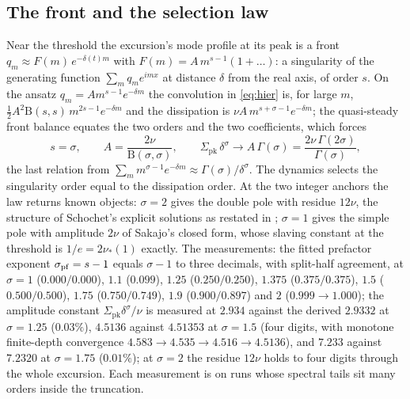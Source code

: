 \documentclass[11pt,a4paper]{article}
\theoremstyle{plain}
\theoremstyle{definition}
\newcommand{\Bfun}{\mathrm{B}}
\newcommand{\pk}{\mathrm{pk}}
\begin{document}
\subsection{The front and the selection law}\label{sec:selection}
Near the threshold the excursion's mode profile at its peak is a front $q_m\approx F(m)\,e^{-\delta(t)m}$ with $F(m)=A\,m^{s-1}(1+\dots)$: a singularity of the generating function $\sum_mq_me^{imx}$ at distance $\delta$ from the real axis, of order $s$. On the ansatz $q_m=Am^{s-1}e^{-\delta m}$ the convolution in \eqref{eq:hier} is, for large $m$, $\tfrac12A^2\Bfun(s,s)\,m^{2s-1}e^{-\delta m}$ and the dissipation is $\nu A\,m^{s+\sigma-1}e^{-\delta m}$; the quasi-steady front balance equates the two orders and the two coefficients, which forces
\begin{equation}\label{eq:selection}
s=\sigma,\qquad A=\frac{2\nu}{\Bfun(\sigma,\sigma)},\qquad \Sigma_{\pk}\,\delta^\sigma\to A\,\Gamma(\sigma)=\frac{2\nu\,\Gamma(2\sigma)}{\Gamma(\sigma)},
\end{equation}
the last relation from $\sum_mm^{\sigma-1}e^{-\delta m}\approx\Gamma(\sigma)/\delta^\sigma$. The dynamics selects the singularity order equal to the dissipation order. At the two integer anchors the law returns known objects: $\sigma=2$ gives the double pole with residue $12\nu$, the structure of Schochet's explicit solutions \cite{Sch86} as restated in \cite[\S5.1]{ALSS24}; $\sigma=1$ gives the simple pole with amplitude $2\nu$ of Sakajo's closed form, whose slaving constant at the threshold is $1/e=2\nu_*(1)$ exactly. The measurements: the fitted prefactor exponent $\sigma_{\rm pf}=s-1$ equals $\sigma-1$ to three decimals, with split-half agreement, at $\sigma=1$ ($0.000/0.000$), $1.1$ ($0.099$), $1.25$ ($0.250/0.250$), $1.375$ ($0.375/0.375$), $1.5$ ($0.500/0.500$), $1.75$ ($0.750/0.749$), $1.9$ ($0.900/0.897$) and $2$ ($0.999\to1.000$); the amplitude constant $\Sigma_{\pk}\delta^\sigma/\nu$ is measured at $2.934$ against the derived $2.9332$ at $\sigma=1.25$ ($0.03\%$), $4.5136$ against $4.51353$ at $\sigma=1.5$ (four digits, with monotone finite-depth convergence $4.583\to4.535\to4.516\to4.5136$), and $7.233$ against $7.2320$ at $\sigma=1.75$ ($0.01\%$); at $\sigma=2$ the residue $12\nu$ holds to four digits through the whole excursion. Each measurement is on runs whose spectral tails sit many orders inside the truncation.
\end{document}
